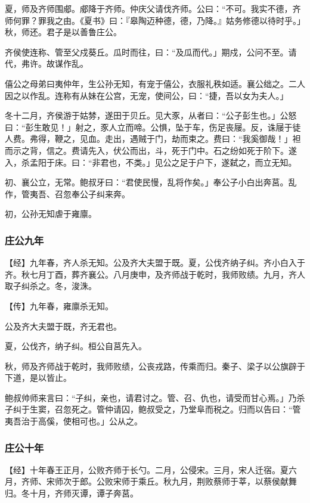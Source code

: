 \documentclass[]{article}
\begin{document}
夏，师及齐师围郕。郕降于齐师。仲庆父请伐齐师。公曰：``不可。我实不德，齐师何罪？罪我之由。《夏书》曰：『皋陶迈种德，德，乃降。』姑务修德以待时乎。」秋，师还。君子是以善鲁庄公。

齐侯使连称、管至父戍葵丘。瓜时而往，曰：``及瓜而代。」期戍，公问不至。请代，弗许。故谋作乱。

僖公之母弟曰夷仲年，生公孙无知，有宠于僖公，衣服礼秩如适。襄公绌之。二人因之以作乱。连称有从妹在公宫，无宠，使间公，曰：``捷，吾以女为夫人。」

冬十二月，齐侯游于姑棼，遂田于贝丘。见大豕，从者曰：``公子彭生也。」公怒曰：``彭生敢见！」射之，豕人立而啼。公惧，坠于车，伤足丧屦。反，诛屦于徒人费。弗得，鞭之，见血。走出，遇贼于门，劫而束之。费曰：``我奚御哉！」袒而示之背，信之。费请先入，伏公而出，斗，死于门中。石之纷如死于阶下。遂入，杀孟阳于床。曰：``非君也，不类。」见公之足于户下，遂弑之，而立无知。

初、襄公立，无常。鲍叔牙曰：``君使民慢，乱将作矣。」奉公子小白出奔莒。乱作，管夷吾、召忽奉公子纠来奔。

初，公孙无知虐于雍廪。

\hypertarget{header-n414}{%
\subsubsection{庄公九年}\label{header-n414}}

【经】九年春，齐人杀无知。公及齐大夫盟于既。夏，公伐齐纳子纠。齐小白入于齐。秋七月丁酉，葬齐襄公。八月庚申，及齐师战于乾时，我师败绩。九月，齐人取子纠杀之。冬，浚洙。

【传】九年春，雍廪杀无知。

公及齐大夫盟于既，齐无君也。

夏，公伐齐，纳子纠。桓公自莒先入。

秋，师及齐师战于乾时，我师败绩，公丧戎路，传乘而归。秦子、梁子以公旗辟于下道，是以皆止。

鲍叔帅师来言曰：``子纠，亲也，请君讨之。管、召、仇也，请受而甘心焉。」乃杀子纠于生窦，召忽死之。管仲请囚，鲍叔受之，乃堂阜而税之。归而以告曰：``管夷吾治于高傒，使相可也。」公从之。

\hypertarget{header-n423}{%
\subsubsection{庄公十年}\label{header-n423}}

【经】十年春王正月，公败齐师于长勺。二月，公侵宋。三月，宋人迁宿。夏六月，齐师、宋师次于郎。公败宋师于乘丘。秋九月，荆败蔡师于莘，以蔡侯献舞归。冬十月，齐师灭谭，谭子奔莒。
\end{document}
